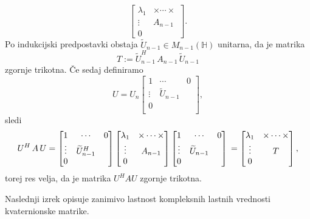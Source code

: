 \documentclass[mat1, tisk]{fmfdelo}
\numberwithin{equation}{section}
\begin{document}
\begin{dokaz}
\begin{equation*}
\begin{bmatrix}
            \lambda_1 & \times \cdots \times \\
            \vdots & A_{n-1} \\
            0 &
        \end{bmatrix}.
    \end{equation*}
    Po indukcijski predpostavki obstaja $\widetilde{U}_{n-1} \in M_{n-1}(\mathbb{H})$ unitarna, da je matrika
    $$T := \widetilde{U}_{n-1}^H \, A_{n-1} \, \widetilde{U}_{n-1} $$ 
    zgornje trikotna. Če sedaj definiramo
    $$U = U_n
    \begin{bmatrix} 
        1      &\cdots           & 0 \\
        \vdots & \tilde{U}_{n-1} &   \\
        0      &                 &   \\ 
    \end{bmatrix},
    $$
    sledi
    \begin{equation*}
        U^H \, A \, U = 
        \begin{bmatrix}
            1 & \cdots &  0 \\
            \vdots  &\widetilde{U}^H_{n-1} &\\
            0 & &\\
        \end{bmatrix}
        \begin{bmatrix}
            \lambda_1 & \times \cdots \times \\
            \vdots & A_{n-1} \\
            0 &
        \end{bmatrix}
        \begin{bmatrix}
            1 & \cdots &  0 \\
            \vdots  &\widetilde{U}_{n-1} &\\
            0 & &\\
        \end{bmatrix}\\
        =
        \begin{bmatrix}
            \lambda_1 & \times \cdots \times \\
            \vdots & T \\
            0 &
        \end{bmatrix},
    \end{equation*}
   torej res velja, da je matrika $U^{H}AU$ zgornje trikotna.
\end{dokaz}

Naslednji izrek opisuje zanimivo lastnost kompleksnih lastnih vrednosti kvaternionske matrike.
\end{document}
